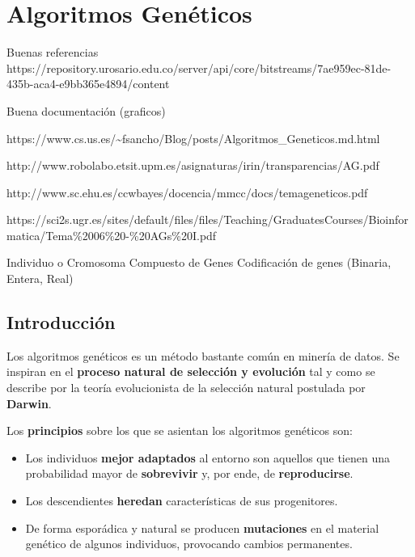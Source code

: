 \documentclass[
  a4paper,
  DIV=11,
  numbers=noendperiod]{scrreprt}
\begin{document}

\hypertarget{algoritmos-genuxe9ticos}{%
\chapter{Algoritmos Genéticos}\label{algoritmos-genuxe9ticos}}

Buenas referencias
https://repository.urosario.edu.co/server/api/core/bitstreams/7ae959ec-81de-435b-aca4-e9bb365e4894/content

Buena documentación (graficos)

https://www.cs.us.es/\textasciitilde fsancho/Blog/posts/Algoritmos\_Geneticos.md.html

http://www.robolabo.etsit.upm.es/asignaturas/irin/transparencias/AG.pdf

http://www.sc.ehu.es/ccwbayes/docencia/mmcc/docs/temageneticos.pdf

https://sci2s.ugr.es/sites/default/files/files/Teaching/GraduatesCourses/Bioinformatica/Tema\%2006\%20-\%20AGs\%20I.pdf

Individuo o Cromosoma Compuesto de Genes Codificación de genes (Binaria,
Entera, Real)

\hypertarget{introducciuxf3n-4}{%
\section{Introducción}\label{introducciuxf3n-4}}

Los algoritmos genéticos es un método bastante común en minería de
datos. Se inspiran en el \textbf{proceso natural de selección y
evolución} tal y como se describe por la teoría evolucionista de la
selección natural postulada por \textbf{Darwin}.

Los \textbf{principios} sobre los que se asientan los algoritmos
genéticos son:

\begin{itemize}
\item
  Los individuos \textbf{mejor adaptados} al entorno son aquellos que
  tienen una probabilidad mayor de \textbf{sobrevivir} y, por ende, de
  \textbf{reproducirse}.
\item
  Los descendientes \textbf{heredan} características de sus
  progenitores.
\item
  De forma esporádica y natural se producen \textbf{mutaciones} en el
  material genético de algunos individuos, provocando cambios
  permanentes.
\end{itemize}
\end{document}
